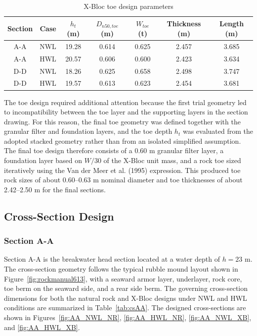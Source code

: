 \documentclass[a4paper, 11pt]{article}
\begin{document}
\begin{table}[H]
\centering
\caption{X-Bloc toe design parameters}
\label{tab:xbloctoe}
\begin{tabular}{ccccccc}
\hline
Section & Case & $h_{t}$ (m) & $D_{n50,toe}$ (m) & $W_{toe}$ (t) & Thickness (m) & Length (m) \\
\hline
A-A & NWL & 19.28 & 0.614 & 0.625 & 2.457 & 3.685 \\
A-A & HWL & 20.57 & 0.606 & 0.600 & 2.423 & 3.634 \\
D-D & NWL & 18.26 & 0.625 & 0.658 & 2.498 & 3.747 \\
D-D & HWL & 19.57 & 0.613 & 0.623 & 2.454 & 3.681 \\
\hline
\end{tabular}
\end{table}

\hspace{0.5cm}The toe design required additional attention because the first trial geometry led to incompatibility between the toe layer and the supporting layers in the section drawing. For this reason, the final toe geometry was defined together with the granular filter and foundation layers, and the toe depth $h_t$ was evaluated from the adopted stacked geometry rather than from an isolated simplified assumption. The final toe design therefore consists of a 0.60 m granular filter layer, a foundation layer based on $W/30$ of the X-Bloc unit mass, and a rock toe sized iteratively using the Van der Meer et al. (1995) expression. This produced toe rock sizes of about 0.60--0.63 m nominal diameter and toe thicknesses of about 2.42--2.50 m for the final sections.

\subsection{Cross-Section Design}
\subsubsection{Section A-A}
\hspace{0.5cm} Section A-A is the breakwater head section located at a water depth of $h = 23$ m. The cross-section geometry follows the typical rubble mound layout shown in Figure~\ref{fig:rockmanual613}, with a seaward armor layer, underlayer, rock core, toe berm on the seaward side, and a rear side berm. The governing cross-section dimensions for both the natural rock and X-Bloc designs under NWL and HWL conditions are summarized in Table~\ref{tab:csAA}. The designed cross-sections are shown in Figures~\ref{fig:AA_NWL_NR}, \ref{fig:AA_HWL_NR}, \ref{fig:AA_NWL_XB}, and \ref{fig:AA_HWL_XB}.
\end{document}
